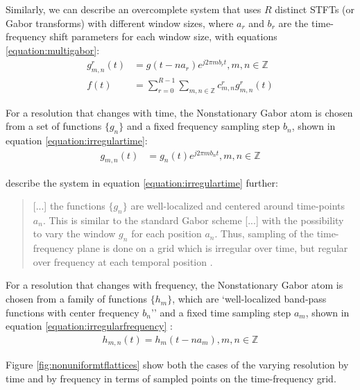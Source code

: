 \documentclass[report.tex]{subfiles}
\begin{document}
Similarly, we can describe an overcomplete system that uses $R$ distinct STFTs (or Gabor transforms) with different window sizes, where $a_{r}$ and $b_{r}$ are the time-frequency shift parameters for each window size, with equations \eqref{equation:multigabor}:
\begin{align}
	\nonumber g_{m,n}^{r}(t) &= g(t - na_{r})e^{j2\pi m b_{r} t}, m,n \in \mathbb{Z}\\
	\nonumber f(t) &= \sum_{r=0}^{R-1}\sum_{m,n \in \mathbb{Z}}c^{r}_{m,n}g^{r}_{m,n}(t) \tag{13}\label{equation:multigabor}
\end{align}

For a resolution that changes with time, the Nonstationary Gabor atom is chosen from a set of functions $\{g_{n}\}$ and a fixed frequency sampling step $b_{n}$, shown in equation \eqref{equation:irregulartime}:
\begin{align}\tag{14}\label{equation:irregulartime}
	g_{m,n}(t) &= g_{n}(t)e^{j2\pi m b_{n}t}, m,n \in \mathbb{Z}
\end{align}

\citeauthor{balazs} describe the system in equation \eqref{equation:irregulartime} further:

\begin{quote}
	[...] the functions $\{g_{n}\}$ are well-localized and centered around time-points $a_{n}$. This is similar to the standard Gabor scheme [...] with the possibility to vary the window $g_{n}$ for each position $a_{n}$. Thus, sampling of the time-frequency plane is done on a grid which is irregular over time, but regular over frequency at each temporal position \parencite[1,485]{balazs}.
\end{quote}

For a resolution that changes with frequency, the Nonstationary Gabor atom is chosen from a family of functions $\{h_{m}\}$, which are `well-localized band-pass functions with center frequency $b_{n}$'' and a fixed time sampling step $a_{m}$, shown in equation \eqref{equation:irregularfrequency} \parencite[1,486]{balazs}:
\begin{align}\tag{15}\label{equation:irregularfrequency}
	h_{m,n}(t) = h_{m}(t - na_{m}), m,n \in \mathbb{Z}
\end{align}

Figure \ref{fig:nonuniformtflattices} show both the cases of the varying resolution by time and by frequency in terms of sampled points on the time-frequency grid.
\end{document}
